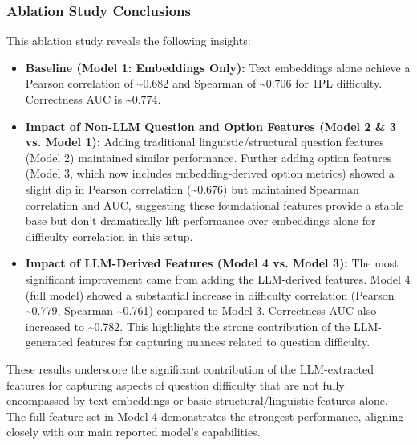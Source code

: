 \documentclass[
    a4paper, %
    10pt, %
    twoside, %
]{LTJournalArticle}
\begin{document}
\begin{table}[H]
    \centering
    \caption{Feature ablation study results: correctness and 1PL vs. 1PL difficulty correlation metrics.}
    \label{tab:ablation-results}
\end{table}

\subsubsection{Ablation Study Conclusions}
This ablation study reveals the following insights:
\begin{itemize}
    \item \textbf{Baseline (Model 1: Embeddings Only):} Text embeddings alone achieve a Pearson correlation of \textasciitilde0.682 and Spearman of \textasciitilde0.706 for 1PL difficulty. Correctness AUC is \textasciitilde0.774.
    \item \textbf{Impact of Non-LLM Question and Option Features (Model 2 \& 3 vs. Model 1):} Adding traditional linguistic/structural question features (Model 2) maintained similar performance. Further adding option features (Model 3, which now includes embedding-derived option metrics) showed a slight dip in Pearson correlation (\textasciitilde0.676) but maintained Spearman correlation and AUC, suggesting these foundational features provide a stable base but don't dramatically lift performance over embeddings alone for difficulty correlation in this setup.
    \item \textbf{Impact of LLM-Derived Features (Model 4 vs. Model 3):} The most significant improvement came from adding the LLM-derived features. Model 4 (full model) showed a substantial increase in difficulty correlation (Pearson \textasciitilde0.779, Spearman \textasciitilde0.761) compared to Model 3. Correctness AUC also increased to \textasciitilde0.782. This highlights the strong contribution of the LLM-generated features for capturing nuances related to question difficulty.
\end{itemize}
These results underscore the significant contribution of the LLM-extracted features for capturing aspects of question difficulty that are not fully encompassed by text embeddings or basic structural/linguistic features alone. The full feature set in Model 4 demonstrates the strongest performance, aligning closely with our main reported model's capabilities.
\end{document}
